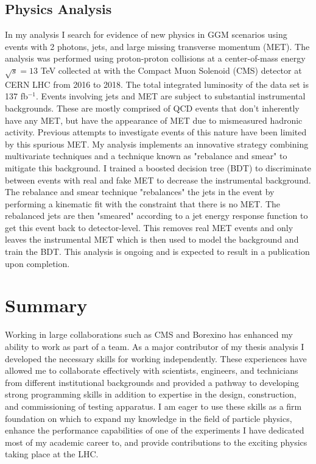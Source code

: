 \documentclass[a4paper]{article}
\begin{document}
\subsection{Physics Analysis}
In my analysis I search for evidence of new physics in GGM scenarios using events with 2 photons, jets, and large missing transverse momentum (MET).  The analysis was performed using proton-proton collisions at a center-of-mass energy $\sqrt{s}=13$ TeV collected at with the Compact Muon Solenoid (CMS) detector at CERN LHC from 2016 to 2018.  The total integrated luminosity of the data set is 137 fb$^{-1}$. Events involving jets and MET are subject to substantial instrumental backgrounds.  These are mostly comprised of QCD events that don't inherently have any MET, but have the appearance of MET due to mismeasured hadronic activity.  Previous attempts to investigate events of this nature have been limited by this spurious MET. My analysis implements an innovative strategy combining multivariate techniques and a technique known as "rebalance and smear" to mitigate this background.  I trained a boosted decision tree (BDT) to discriminate between events with real and fake MET to decrease the instrumental background.  The rebalance and smear technique "rebalances" the jets in the event by performing a kinematic fit with the constraint that there is no MET.  The rebalanced jets are then "smeared" according to a jet energy response function to get this event back to detector-level.  This removes real MET events and only leaves the instrumental MET which is then used to model the background and train the BDT. This analysis is ongoing and is expected to result in a publication upon completion.



\section{Summary}
Working in large collaborations such as CMS and Borexino has enhanced my ability to work as part of a team. As a major contributor of my thesis analysis I developed the necessary skills for working independently.  These experiences have allowed me to collaborate effectively with scientists, engineers, and technicians from different institutional backgrounds and provided a pathway to developing strong programming skills in addition to expertise in the design, construction, and commissioning of testing apparatus.  I am eager to use these skills as a firm foundation on which to expand my knowledge in the field of particle physics, enhance the performance capabilities of one of the experiments I have dedicated most of my academic career to, and provide contributions to the exciting physics taking place at the LHC.
	

	
\end{document}
